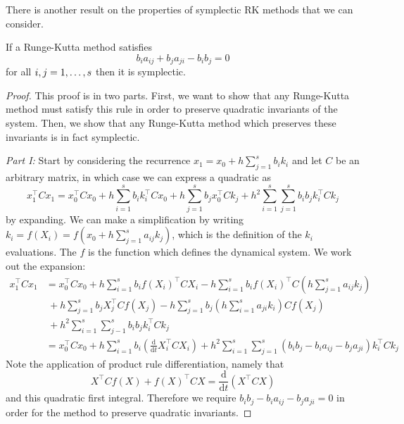 There is another result on the properties of symplectic RK methods that we can consider.
\begin{theorem}
\label{thm:symrk}
If a Runge-Kutta method satisfies
\begin{equation}
	b_i a_{ij} + b_j a_{ji} - b_i b_j = 0
\end{equation}
for all $i, j = 1, \mathellipsis, s$ then it is symplectic.
\end{theorem}
\begin{proof}
This proof is in two parts. First, we want to show that any Runge-Kutta method must satisfy this rule in order to preserve quadratic invariants of the system.
Then, we show that any Runge-Kutta method which preserves these invariants is in fact symplectic.

\textit{Part I:}
Start by considering the recurrence $x_1 = x_0 + h \sum_{j=1}^{s} b_i k_i$ and let $C$ be an arbitrary matrix, in which case we can express a quadratic as
\begin{equation}
	x_1^\top C x_1 = x_0^\top C x_0 + h \sum_{i=1}^{s} b_i k_i^\top C x_0 + h \sum_{j=1}^{s} b_j x_0^\top C k_j + h^2 \sum_{i=1}^{s} \sum_{j=1}^{s} b_i b_j k_i^\top C k_j
\end{equation} %
by expanding. We can make a simplification by writing $k_i = f(X_i) = f\left(x_0 + h \sum_{j=1}^{s}a_{ij}k_j\right)$, which is the definition of the $k_i$ evaluations.
The $f$ is the function which defines the dynamical system.
We work out the expansion:
\begin{align*}
	x_1^\top C x_1 &= x_0^\top C x_0 + h \sum_{i = 1}^{s} b_i f(X_i)^\top C X_i - h \sum_{i=1}^{s}b_i f(X_i)^\top C \left( h\sum_{j=1}^{s}a_{ij} k_j \right) \\
	&~ +h \sum_{j = 1}^{s} b_j X_j^\top C f(X_j) - h \sum_{j=1}^{s}b_j \left( h\sum_{i=1}^{s}a_{ji} k_i \right) C f(X_j) \\
	&~ + h^2 \sum_{i=1}^{s} \sum_{j-1}^{s} b_i b_j k_i^\top C k_j \\
	&= x_0^\top C x_0 + h \sum_{i=1}^{s} b_i \left(
		\frac{\mathrm{d}}{\mathrm{d}t} X_i^\top C X_i
	\right) + h^2 \sum_{i=1}^{s} \sum_{j=1}^{s} (b_i b_j - b_i a_{ij} - b_j a_{ji})k_i^\top C k_j
\end{align*}
Note the application of product rule differentiation, namely that
\begin{equation*}
	X^\top C f(X) + f(X)^\top C X = \frac{\mathrm{d}}{\mathrm{d}t} (X^\top C X)
\end{equation*}
and this quadratic first integral.
Therefore we require $b_i b_j - b_i a_{ij} - b_j a_{ji} = 0$ in order for the method to preserve quadratic invariants.


\end{proof}
